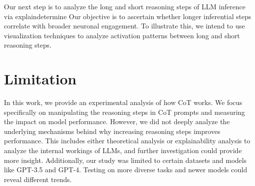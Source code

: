 \documentclass[11pt]{article}
\begin{document}
Our next step is to analyze the long and short reasoning steps of LLM inference via explaindetermine%
Our objective is to ascertain whether longer inferential steps correlate with broader neuronal engagement. To illustrate this, we intend to use visualization techniques to analyze activation patterns between long and short reasoning steps. 
\section{Limitation}
In this work, we provide an experimental analysis of how CoT works. We focus specifically on manipulating the reasoning steps in CoT prompts and measuring the impact on model performance. However, we did not deeply analyze the underlying mechanisms behind why increasing reasoning steps improves performance. This includes either theoretical analysis or explainability analysis to analyze the internal workings of LLMs, and further investigation could provide more insight. Additionally, our study was limited to certain datasets and models like GPT-3.5 and GPT-4. Testing on more diverse tasks and newer models could reveal different trends. 

\end{document}
